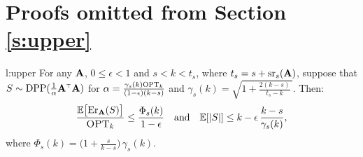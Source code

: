 \documentclass{article}
\begin{document}
\section{Proofs omitted from Section \ref{s:upper}}
\begin{replemma}{l:upper}
For any $\mathbf A$, $0\leq\epsilon<1$ and $s<k<t_s$, where $t_s=s+{\mathrm{sr}}_s(\mathbf A)$,
suppose that $S\sim\DPP(\frac1\alpha\A^\top\A)$ for
$\alpha=\frac{\gamma_s(k){\textsc{OPT}_k}}{(1-\epsilon)(k-s)}$ and
$\gamma_s(k)=\sqrt{1+\frac{2(k-s)}{t_s-k}\,}$. Then: 
\begin{align*}
  \frac{\mathbb E\big[\mathrm{Er}_\mathbf A(S)\big]}{{\textsc{OPT}_k}}\leq \frac{\Phi_s(k)}{1-\epsilon}
  \quad\text{and}\quad \mathbb E[|S|]\leq k-\epsilon\,\frac{k-s}{\gamma_s(k)},
\end{align*}
where $\Phi_s(k) =\big(1+\frac{s}{k-s}\big)\,\gamma_s(k)$.
 \end{replemma}
\end{document}
